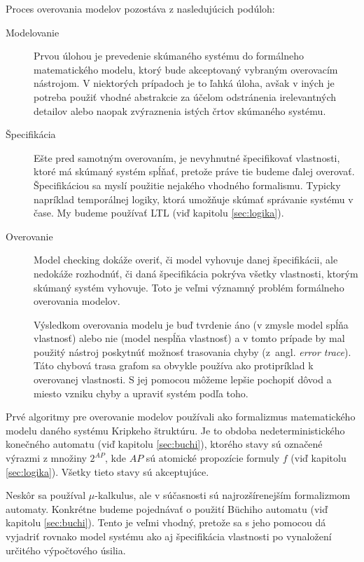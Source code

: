 \documentclass[11pt,final,oneside]{fithesis}
\begin{document}
Proces overovania modelov pozost\'ava z nasleduj\'ucich pod\'uloh:
\begin{description}
\item[Modelovanie] 
Prvou \'ulohou je prevedenie sk\'uman\'eho syst\'emu do form\'alneho matematick\'eho modelu, ktor\'y bude akceptovan\'y vybran\'ym o\-verovac\'im n\'astrojom.
V niektor\'ych pr\'ipadoch je to \v lahk\'a \'uloha, av\v sak v in\'ych je potreba pou\v zi\v t vhodn\'e abstrakcie za \'u\v celom odstr\'anenia 
irelevantn\'ych detailov alebo naopak zv\'yraznenia ist\'ych \v crtov sk\'uman\'eho syst\'emu.
\item[\v Specifik\'acia]
E\v ste pred samotn\'ym overovan\'im, je nevyhnutn\'e \v specifikova\v t vlastnosti, ktor\'e m\'a sk\'uman\'y syst\'em sp\'l\v na\v t, preto\v ze pr\'ave tie
budeme \v dalej overova\v t. \v Specifik\'aciou sa mysl\'i pou\v zitie nejak\'eho vhodn\'eho formalismu. Typicky napr\'iklad tempor\'alnej logiky, ktor\'a
umo\v z\v nuje sk\'uma\v t spr\'avanie syst\'emu v \v case. My budeme pou\v z\'iva\v t LTL (vi\v d kapitolu \ref{sec:logika}).
\item[Overovanie]
Model checking dok\'a\v ze overi\v t, \v ci model vyhovuje danej \v specifik\'acii, ale nedok\'a\v ze rozhodn\'u\v t, \v ci dan\'a \v specifik\'acia 
pokr\'yva v\v setky vlastnosti, ktor\'ym sk\'uman\'y syst\'em vyhovuje. Toto je ve\v lmi v\'yznam\-n\'y probl\'em form\'alneho overovania modelov.

V\'ysledkom overovania modelu je bu\v d tvrdenie \'ano (v zmysle model sp\'l\v na vlastnos\v t) alebo nie (model nesp\'l\v na vlastnos\v t) a v tomto pr\'ipade
by mal pou\v zit\'y n\'astroj poskytn\'u\v t mo\v znos\v t trasovania chyby (z~angl. \textit{error trace}). T\'ato chybov\'a trasa grafom sa obvykle 
pou\v z\'iva ako protipr\'iklad k overovanej vlastnosti. S jej pomocou m\^ o\v zeme lep\v sie pochopi\v t d\^ ovod a miesto vzniku chyby a upravi\v t syst\'em 
pod\v la toho. \cite{Clarke:MC:Process}
\end{description}

Prv\'e algoritmy pre overovanie modelov pou\v z\'ivali ako formalizmus matematick\'eho modelu dan\'eho syst\'emu Kripkeho \v strukt\'uru. Je to obdoba 
nedeterministick\'eho kone\v cn\'eho automatu (vi\v d kapitolu \ref{sec:buchi}), ktor\'eho stavy s\'u ozna\v cen\'e v\'yrazmi z mno\v ziny $2^{AP}$, kde 
$AP$ s\'u atomick\'e propoz\'icie formuly $f$ (vi\v d kapitolu \ref{sec:logika}). V\v setky tieto stavy s\'u akceptuj\'uce.

Nesk\^ or sa pou\v z\'ival $\mu$-kalkulus, ale v s\'u\v casnosti s\'u najroz\v s\'irenej\v s\'im formalizmom automaty. Konkr\'etne budeme pojedn\'ava\v t 
o pou\v zit\'i B\"uchiho automatu (vi\v d kapitolu \ref{sec:buchi}). Tento je ve\v lmi vhodn\'y, preto\v ze sa s jeho pomocou d\'a vyjadri\v t rovnako
model syst\'emu ako aj \v specifik\'acia vlastnosti po vynalo\v zen\'i ur\v cit\'eho v\'ypo\v ctov\'eho \'usilia.
\end{document}
